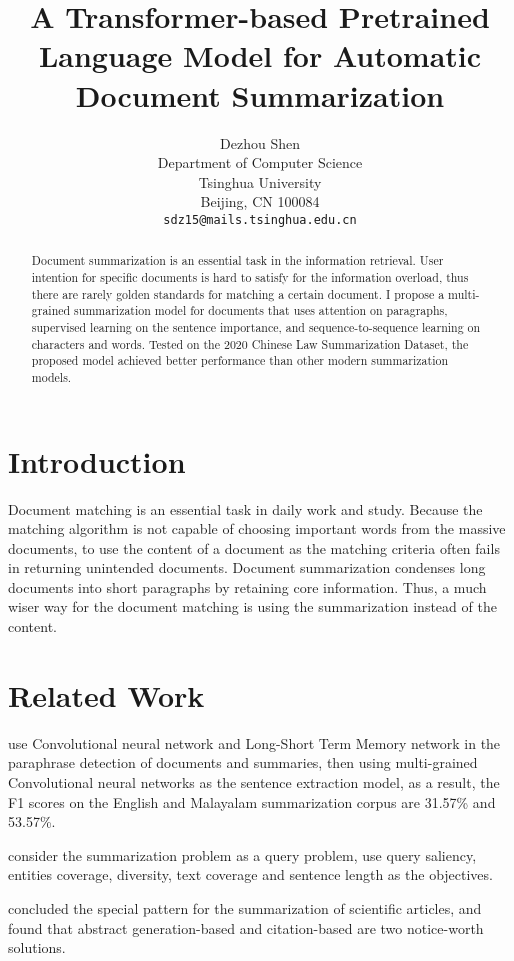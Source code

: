 \documentclass[11pt,a4paper]{article}
\title{A Transformer-based Pretrained Language Model for Automatic Document Summarization}
\author{Dezhou Shen \\
  Department of Computer Science\\
  Tsinghua University\\
  Beijing, CN 100084\\
  \texttt{sdz15@mails.tsinghua.edu.cn} \\}
\date{}
\begin{document}
\maketitle
\begin{abstract}
 Document summarization is an essential task in the information retrieval.
 User intention for specific documents is hard to satisfy for the information overload,
 thus there are rarely golden standards for matching a certain document.
 I propose a multi-grained summarization model for documents that uses attention on paragraphs,
 supervised learning on the sentence importance, and sequence-to-sequence learning on characters and words.
 Tested on the 2020 Chinese Law Summarization Dataset, the proposed model achieved
 better performance than other modern summarization models.

\end{abstract}

\section{Introduction}

Document matching is an essential task in daily work and study.
Because the matching algorithm is not capable of choosing important words from the massive documents,
to use the content of a document as the matching criteria often fails in returning unintended documents.
Document summarization condenses long documents into short paragraphs by retaining core information.
Thus, a much wiser way for the document matching is using the summarization instead of the content.

\section{Related Work}

\citet{bhargava2020deep} use Convolutional neural network and Long-Short Term Memory network in the paraphrase detection of
documents and summaries, then using multi-grained Convolutional neural networks as the sentence extraction model,
as a result, the F1 scores on the English and Malayalam summarization corpus are 31.57\% and 53.57\%.

\citet{erera2019summarization} consider the summarization problem as a query problem, use query
saliency, entities coverage, diversity, text coverage and sentence length as the objectives.

\citet{altmami2020automatic} concluded the special pattern for the summarization of scientific articles,
and found that abstract generation-based and citation-based are two notice-worth solutions.
\end{document}
